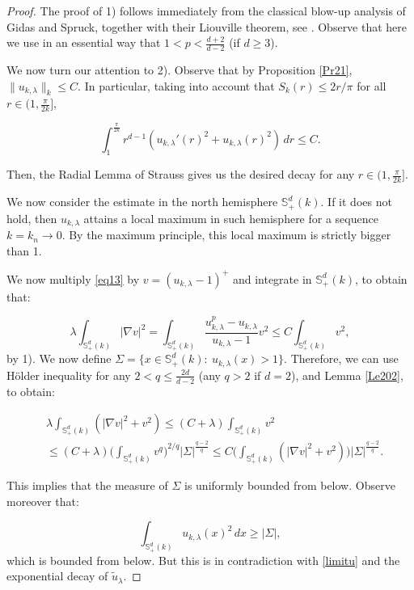 \documentclass[reqno]{amsart}
\numberwithin{equation}{section}
\newenvironment{key words}{\textbf{Keywords}\mbox{  }}{ }
\begin{document}
\begin{proof}
	
The proof of 1) follows immediately from the classical blow-up analysis of Gidas and Spruck, together with their Liouville theorem, see \cite{gs1, gs2}. Observe that here we use in an essential way that $1<p< \frac{d+2}{d-2}$ (if $d \geq 3$).

We now turn our attention to 2). Observe that by Proposition \ref{Pr21}, $\| u_{k, \lambda} \|_k \leq C$. In particular, taking into account that $S_k(r) \leq 2r /\pi $ for all $r \in (1, \frac{\pi}{2k}]$,

$$ \int_1^{\frac{\pi}{2k}} r^{d-1} (u_{k, \lambda}'(r)^2 + u_{k, \lambda}(r)^2) \, dr \leq C.$$

Then, the Radial Lemma of Strauss \cite{strauss} gives us the desired decay for any $r \in (1, \frac{\pi}{2k}]$.

We now consider the estimate in the north hemisphere $\mathbb{S}_+^{d}(k)$. If it does not hold, then $u_{k,\lambda}$ attains a local maximum in such hemisphere for a sequence $k=k_n \to 0$. By the maximum principle, this local maximum is strictly bigger than 1.

We now multiply \eqref{eq13} by $v= (u_{k, \lambda}-1)^+$ and integrate in $\mathbb{S}_+^{d}(k)$, to obtain that:

$$ \lambda \int_{\mathbb{S}_+^{d}(k)}  |\nabla v|^2 =  \int_{\mathbb{S}_+^{d}(k)} \frac{u_{k, \lambda}^p - u_{k, \lambda}}{u_{k, \lambda}-1} v^2 \leq C \int_{\mathbb{S}_+^{d}(k)} v^2,$$
by 1). We now define $\Sigma=\{x \in \mathbb{S}_+^{d}(k): \ u_{k, \lambda}(x) >1 \}$. Therefore, we can use H\"{o}lder inequality for any $2< q \le\frac{2d}{d-2}$ (any $q >2$ if $d=2$), and Lemma \ref{Le202}, to obtain:


\begin{align*} & \lambda \int_{\mathbb{S}_+^{d}(k)}  (|\nabla v|^2 +v^2) \leq (C+ \lambda) \int_{\mathbb{S}_+^{d}(k)} v^2 \\ &\leq (C+ \lambda) \Big( \int_{\mathbb{S}_+^{d}(k)} v^q \Big)^{2/q} |\Sigma| ^{\frac{q-2}{q}} \leq C \Big( \int_{\mathbb{S}_+^{d}(k)}  (|\nabla v|^2 +v^2) \Big)|\Sigma| ^{\frac{q-2}{q}}. \end{align*}


 This implies that the measure of $\Sigma$ is uniformly bounded from below. Observe moreover that:

$$ \int_{\mathbb{S}_+^{d}(k)} u_{k, \lambda}(x)^2 \, dx \geq |\Sigma|,$$
which is bounded from below. But this is in contradiction with \eqref{limitu} and the exponential decay of $\tilde{u}_{\lambda}$.


	
\end{proof}
\end{document}
